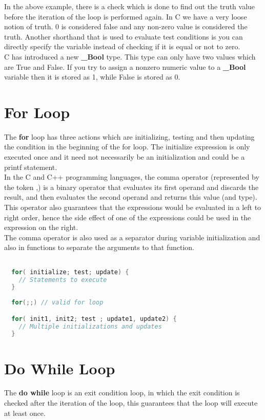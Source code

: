 \documentclass[11pt,a4paper,oneside]{book}
\begin{document}
\noindent In the above example, there is a check which is done to find out the
truth value before the iteration of the loop is performed again. In C we have a very
loose notion of truth. 0 is considered false and any non-zero value is considered
the truth. Another shorthand that is used to evaluate test conditions is you can 
directly specify the variable instead of checking if it is equal or not to zero.\\

\noindent C has introduced a new \textbf{\_Bool} type. This type can only have two
values which are True and False. If you try to assign a nonzero numeric value to a
\textbf{\_Bool} variable then it is stored as 1, while False is stored as 0.

\section{For Loop}
\noindent The \textbf{for} loop has three actions which are initializing, testing 
and then updating the condition in the beginning of the for loop. The initialize
expression is only executed once and it need not necessarily be an initialization
and could be a printf statement.\\

\noindent In the C and C++ programming languages, the comma operator (represented
by the token ,) is a binary operator that evaluates its first operand and discards
the result, and then evaluates the second operand and returns this value (and type).
This operator also guarantees that the expressions would be evaluated in a left to
right order, hence the side effect of one of the expressions could be used in the
expression on the right.\\

\noindent The comma operator is also used as a separator during variable initialization
and also in functions to separate the arguments to that function.

\begin{lstlisting}[language=C, title=For loop]

  for( initialize; test; update) {
    // Statements to execute  
  }
  
  for(;;) // valid for loop

  for( init1, init2; test ; update1, update2) {
    // Multiple initializations and updates
  }
\end{lstlisting}

\section{Do While Loop}
\noindent The \textbf{do while} loop is an exit condition loop, in which the exit
condition is checked after the iteration of the loop, this guarantees that the
loop will execute at least once.
\end{document}

